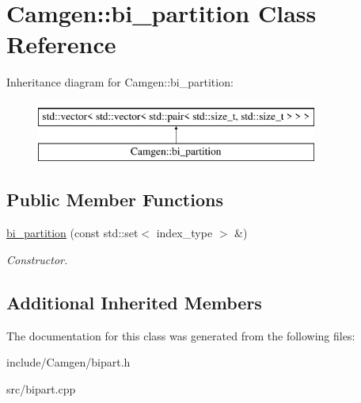 \hypertarget{a00027}{\section{Camgen\-:\-:bi\-\_\-partition Class Reference}
\label{a00027}
}
Inheritance diagram for Camgen\-:\-:bi\-\_\-partition\-:\begin{figure}[H]
\begin{center}
\leavevmode
\includegraphics[height=2.000000cm]{a00027}
\end{center}
\end{figure}
\subsection*{Public Member Functions}
\begin{DoxyCompactItemize}
\item 
\hypertarget{a00027_afc0561a02fd718108cb713a6a42e70b3}{\hyperlink{a00027_afc0561a02fd718108cb713a6a42e70b3}{bi\-\_\-partition} (const std\-::set$<$ index\-\_\-type $>$ \&)}\label{a00027_afc0561a02fd718108cb713a6a42e70b3}

\begin{DoxyCompactList}\small\item\em Constructor. \end{DoxyCompactList}\end{DoxyCompactItemize}
\subsection*{Additional Inherited Members}


The documentation for this class was generated from the following files\-:\begin{DoxyCompactItemize}
\item 
include/\-Camgen/bipart.\-h\item 
src/bipart.\-cpp\end{DoxyCompactItemize}
